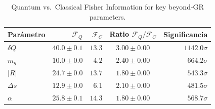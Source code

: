 \begin{table}[ht]
\centering
\caption{Quantum vs.\ Classical Fisher Information for key beyond-GR parameters.}
\begin{tabular}{lrrcr}
\toprule
Parámetro & $\mathcal{F}_Q$ & $\mathcal{F}_C$ & Ratio $\mathcal{F}_Q/\mathcal{F}_C$ & Significancia \\
\midrule
$δQ$ & $40.0\pm0.1$ & $13.3$ & $3.00\pm0.00$ & $1142.0\sigma$ \\
$m_g$ & $10.0\pm0.0$ & $4.2$ & $2.40\pm0.00$ & $664.2\sigma$ \\
$|R|$ & $24.7\pm0.0$ & $13.7$ & $1.80\pm0.00$ & $543.3\sigma$ \\
$Δs$ & $12.9\pm0.0$ & $6.1$ & $2.10\pm0.00$ & $481.5\sigma$ \\
$α$ & $25.8\pm0.1$ & $14.3$ & $1.80\pm0.00$ & $568.7\sigma$ \\
\bottomrule
\end{tabular}
\end{table}